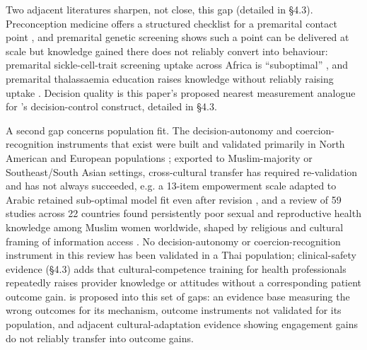 Two adjacent literatures sharpen, not close, this gap (detailed in \S4.3). Preconception medicine offers a structured checklist for a premarital contact point \cite{ref11}, and premarital genetic screening shows such a point can be delivered at scale but knowledge gained there does not reliably convert into behaviour: premarital sickle-cell-trait screening uptake across Africa is ``suboptimal'' \cite{ref12}, and premarital thalassaemia education raises knowledge without reliably raising uptake \cite{ref13}. Decision quality is this paper's proposed nearest measurement analogue for \tphe{}'s decision-control construct, detailed in \S4.3.

A second gap concerns population fit. The decision-autonomy and coercion-recognition instruments that exist were built and validated primarily in North American and European populations \cite{ref16,ref17,ref18}; exported to Muslim-majority or Southeast/South Asian settings, cross-cultural transfer has required re-validation and has not always succeeded, e.g. a 13-item empowerment scale adapted to Arabic retained sub-optimal model fit even after revision \cite{ref19}, and a review of 59 studies across 22 countries found persistently poor sexual and reproductive health knowledge among Muslim women worldwide, shaped by religious and cultural framing of information access \cite{ref20}. No decision-autonomy or coercion-recognition instrument in this review has been validated in a Thai population; clinical-safety evidence (\S4.3) adds that cultural-competence training for health professionals repeatedly raises provider knowledge or attitudes without a corresponding patient outcome gain. \tphe{} is proposed into this set of gaps: an evidence base measuring the wrong outcomes for its mechanism, outcome instruments not validated for its population, and adjacent cultural-adaptation evidence showing engagement gains do not reliably transfer into outcome gains.

